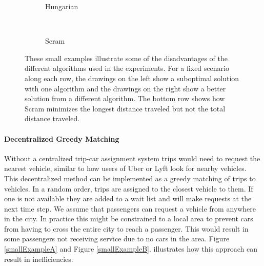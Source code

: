 \documentclass[letterpaper]{article}
\begin{document}
\begin{figure}
\begin{subfigure}[t]{0.2\textwidth}
\caption{Hungarian}
\label{smallExampleE}
\end{subfigure}
~
\begin{subfigure}[t]{0.2\textwidth}
\caption{Scram}
\label{smallExampleF}
\end{subfigure}

\caption{These small examples illustrate some of the disadvantages of the different algorithms used in the experiments. For a fixed scenario along each row, the drawings on the left show a suboptimal solution with one algorithm and the drawings on the right show a better solution from a different algorithm. The bottom row shows how Scram minimizes the longest distance traveled but not the total distance traveled.} 
\label{smallExampleFigure}
\end{figure}

\paragraph{Decentralized Greedy Matching}
Without a centralized trip-car assignment system trips would need to request the nearest vehicle, similar to how users of Uber or Lyft look for nearby vehicles. This decentralized method can be implemented as a greedy matching of trips to vehicles. In a random order, trips are assigned to the closest vehicle to them. If one is not available they are added to a wait list and will make requests at the next time step. We assume that passengers can request a vehicle from anywhere in the city. In practice this might be constrained to a local area to prevent cars from having to cross the entire city to reach a passenger. This would result in some passengers not receiving service due to no cars in the area. Figure \ref{smallExampleA} and Figure \ref{smallExampleB}. illustrates how this approach can result in inefficiencies.
\end{document}
